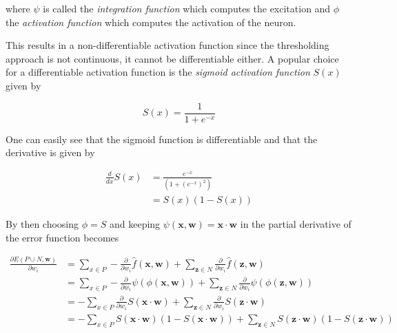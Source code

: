 where $\psi$ is called the \textit{integration function} which computes the excitation and $\phi$ the \textit{activation function} which computes the activation of the neuron.

This results in a non-differentiable activation function since the thresholding approach is not continuous, it cannot be differentiable either.
A popular choice for a differentiable activation function is the \textit{sigmoid activation function} $S(x)$ given by

\begin{equation}
    S(x) = \frac{1}{1 + e^{-x}}
\end{equation}

One can easily see that the sigmoid function is differentiable and that the derivative is given by

\begin{equation}
    \begin{split}
        \frac{d}{dx} S(x)
        &= \frac{e^{-x}}{(1 + (e^{-x})^2)} \\
        &= S(x)(1 - S(x))
    \end{split}
\end{equation}

By then choosing $\phi = S$ and keeping $\psi(\bm{x}, \bm{w}) = \bm{x} \cdot \bm{w}$ in  the partial derivative of the error function becomes

\begin{equation}
    \label{eq:error-derivative-2}
    \begin{split}
        \frac{\partial E(P \cup N, \bm{w})}{\partial w_i}
        &= \sum_{x \in P} - \frac{\partial }{\partial w_i} \hat{f}(\bm{x},\bm{w}) + \sum_{\bm{z} \in N} \frac{\partial }{\partial w_i} \hat{f}(\bm{z},\bm{w})  \\
        &=  \sum_{x \in P} - \frac{\partial }{\partial w_i} \psi(\phi(\bm{x},\bm{w})) + \sum_{\bm{z} \in N} \frac{\partial }{\partial w_i} \psi(\phi(\bm{z},\bm{w})) \\
        &=  - \sum_{x \in P} \frac{\partial }{\partial w_i} S(\bm{x} \cdot \bm{w}) + \sum_{\bm{z} \in N} \frac{\partial }{\partial w_i} S(\bm{z} \cdot \bm{w}) \\
        &=  - \sum_{x \in P}  S(\bm{x} \cdot \bm{w}) (1 - S(\bm{x} \cdot \bm{w})) + \sum_{\bm{z} \in N} S(\bm{z} \cdot \bm{w}) (1 - S(\bm{z} \cdot \bm{w}))\\
    \end{split}
\end{equation}

